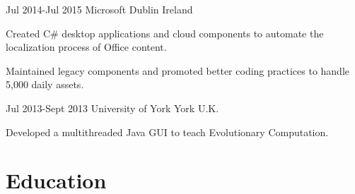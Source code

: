 \documentclass[10pt]{CurriculumVitae}
\begin{document}
      {Jul 2014-Jul 2015}
      {Microsoft} 
      {Dublin}
      {Ireland}
      {
        \item Created C\# desktop applications and cloud components to automate the localization
        process of Office content.
        \item Maintained legacy components and promoted better coding practices to handle 5,000 daily assets.
      }
    
      {Jul 2013-Sept 2013}
      {University of York}
      {York}
      {U.K.}
      {
        \item Developed a multithreaded Java GUI to teach Evolutionary Computation.
      } 


  \section{Education}
   
\end{document}
